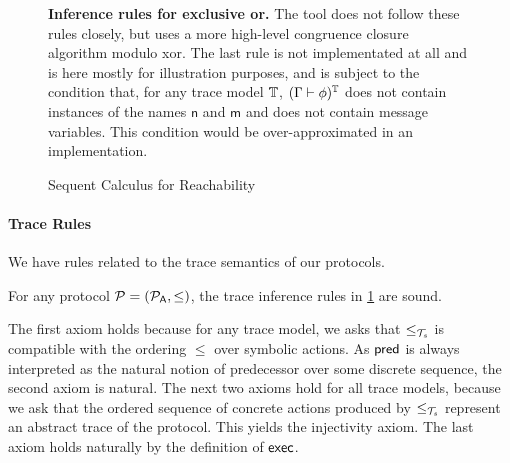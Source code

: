 \begin{figure}[tp]
\begin{mathpar}
  \end{mathpar}

  \textbf{Inference rules for exclusive or.}
  The tool does not follow these rules closely, but uses a more high-level
  congruence closure algorithm modulo xor. The last rule is not implementated
  at all and is here mostly for illustration purposes, and is subject to
  the condition that, for any trace model $\TM$,
  $\interp{\Gamma\vdash\phi}^\TM$ does not contain instances of the names
  $\mathsf{n}$ and $\mathsf{m}$ and does not contain message variables.
  This condition would be over-approximated in an implementation. 
  \begin{mathpar}



  \end{mathpar}

  \caption{Sequent Calculus for Reachability}
  \label{fig:seq-reach}
\end{figure}

\paragraph{Trace Rules}
We have rules related to the trace semantics of our protocols.

\begin{proposition}
  For any protocol $\calp = (\calp_\sfA, \le)$, the trace inference rules in \cref{fig:seq-reach} are sound.
\end{proposition}


The first axiom holds because for any trace model, we asks that $\leq_\XT$ is compatible with the ordering $\leq$ over symbolic actions.
As $\pre$ is always interpreted as the natural notion of predecessor over some discrete sequence, the second axiom is natural. The next two axioms hold for all trace models, because we ask that the ordered sequence of concrete actions produced by $\leq_\XT$ represent an abstract trace of the protocol. This yields the injectivity axiom. The last axiom holds naturally by the definition of $\mexec$.

